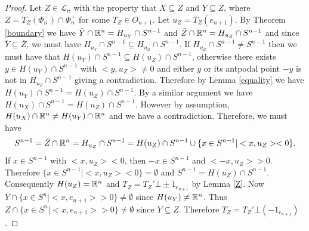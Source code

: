 \documentclass[psamsfonts]{amsart}
\numberwithin{equation}{subsection}
\theoremstyle{plain}
\theoremstyle{definition}
\theoremstyle{remark}
\begin{document}
\begin{proof} Let $Z \in \mathcal{L}_n$ with  the property that $X\subseteq Z$ and $Y\subseteq Z$, where 
$Z = T_Z(\Phi_n^-)\cap \Phi_n^+$ for some $T_Z \in O_{n + 1}$. Let $u_Z = T_Z(e_{n + 1})$.
By Theorem \ref{boundary}  we have   $\bar{Y}\cap  \Bbb{R}^n = H_{u_Y} \cap S^{n - 1}$ and $\bar{Z}\cap  \Bbb{R}^n = H_{u_Z} \cap S^{n - 1}$ and since $\bar{Y} \subseteq \bar{Z}$, we must have $H_{u_Y} \cap S^{n - 1} \subseteq H_{u_Z} \cap S^{n - 1}$. If $H_{u_Z} \cap S^{n - 1} \not= S^{n - 1}$ then we must have that $H({u_Y}) \cap S^{n - 1} \subseteq H({u_Z}) \cap S^{n - 1}$, otherwise there exists $y \in H({u_Y}) \cap S^{n - 1}$ with $< y, u_Z> \not= 0$ and either $y$ or its antpodal point $-y$ is not in $ H_{u_Z} \cap S^{n - 1}$ giving a contradiction. 
Therefore by Lemma \ref{equality} we have $H({u_Y}) \cap S^{n - 1} = H({u_Z}) \cap S^{n - 1}$. By a similar argument 
we have $H({u_X}) \cap S^{n - 1} = H({u_Z}) \cap S^{n - 1}$. However 
by assumption, $H(u_X) \cap \Bbb{R}^{n} \not= H(u_Y) \cap \Bbb{R}^{n}$ and we have a contradiction. Therefore, we must have 
$$S^{n - 1} = \bar{Z}\cap  \Bbb{R}^n = H_{u_Z} \cap S^{n - 1} = H(u_Z) \cap S^{n - 1} \cup \{x \in S^{n - 1} | <x,  u_Z> < 0\}.$$
 If $x \in S^{n - 1}$ with $ <x,  u_Z> < 0$, then $-x \in S^{n - 1}$ and $<-x ,  u_Z> > 0$. Therefore $\{x \in S^{n - 1} | <x,  u_Z> < 0\} = \emptyset $ and $S^{n - 1} =  H(u_Z) \cap S^{n - 1}$. Consequently $H(u_Z)  = \Bbb{R}^n$ 
and $T_Z = T_Z' \bot \pm1_{e_{n + 1}}$  by Lemma \ref{Z}.  Now $Y \cap \{x \in S^n | <x, e_{n + 1}> > 0\} \not= \emptyset$ since $H(u_Y) \not= \Bbb{R}^{n}$. Thus $Z\cap \{x \in S^n | <x, e_{n + 1}> > 0\} \not= \emptyset$ since $Y \subseteq Z$. Therefore 
$T_Z = T_Z' \bot (-1_{e_{n + 1}})$. 
 \end{proof}
\end{document}
